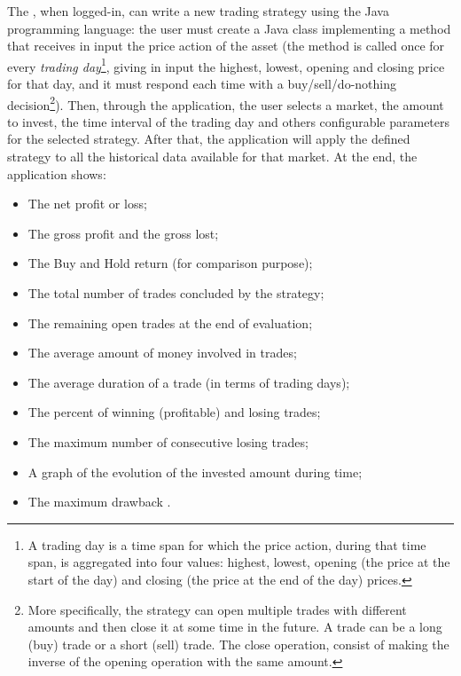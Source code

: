 The , when logged-in, can write a new trading strategy using the
Java programming language: the user must create a Java class implementing a
method that receives in input the price action of the asset (the method is
called once for every \emph{trading day}\footnote{A trading day is a time span
for which the price action, during that time span, is aggregated into four
values: highest, lowest, opening (the price at the start of the day) and closing
(the price at the end of the day) prices.}, giving in input the highest, lowest,
opening and closing price for that day, and it must respond each time with a
buy/sell/do-nothing decision\footnote{More specifically, the strategy can open
multiple trades with different amounts and then close it at some time in the
future. A trade can be a long (buy) trade or a short (sell) trade. The close
operation, consist of making the inverse of the opening operation with the same
amount.}). Then, through the application, the user selects a market, the amount
to invest, the time interval of the trading day and others configurable
parameters for the selected strategy. After that, the application will apply the
defined strategy to all the historical data available for that market. At the
end, the application shows:
\begin{itemize}
	\item The net profit or loss;
	\item The gross profit  and the gross lost;
	\item The Buy and Hold return (for comparison purpose);
	\item The total number of trades concluded by the strategy;
	\item The remaining open trades at the end of evaluation;
	\item The average amount of money involved in trades;
	\item The average duration of a trade (in terms of trading days);
	\item The percent of winning (profitable) and losing trades;
	\item The maximum number of consecutive losing trades;
	\item A graph of the evolution of the invested amount during time;
	\item The maximum drawback .
\end{itemize}

